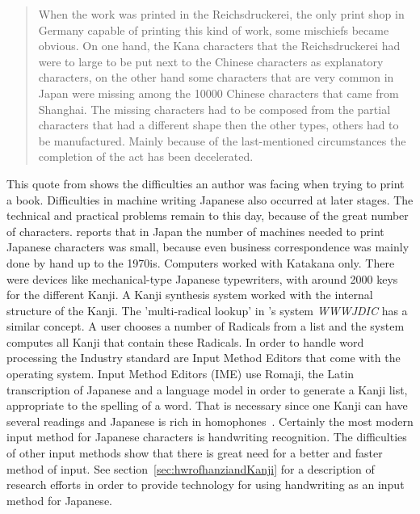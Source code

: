 \begin{quote}
When the work was printed in the Reichsdruckerei, the only print shop
in Germany capable of printing this kind of work, some mischiefs became obvious.
On one hand, the Kana characters that the Reichsdruckerei had were to large to
be put next to the Chinese characters as explanatory characters, on the other
hand some characters that are very common in Japan were missing among 
the 10000 Chinese characters that came from Shanghai.
The missing characters had to be composed from the partial characters that
had a different shape then the other types, others had to be manufactured.
Mainly because of the last-mentioned circumstances the completion of the
act has been decelerated.
\end{quote}
This quote from  shows the difficulties an author
was facing when trying to print a book. 
Difficulties in machine writing Japanese also occurred at later stages. The 
technical and practical problems remain to this day, because of the great number
of characters.  reports that in Japan the number of 
machines needed to print Japanese characters was small, because even business
correspondence was mainly done by hand up to the 1970is. Computers worked with
Katakana only. There were devices like mechanical-type Japanese typewriters,
with around 2000 keys for the different Kanji. A Kanji synthesis system worked
with the internal structure of the Kanji. The 'multi-radical lookup' in 
's \citeyear{Breen2004} system \emph{WWWJDIC} has
a similar concept. A user chooses a number of Radicals from a list and the 
system computes all Kanji that contain these Radicals.
In order to handle word processing the Industry standard are Input Method Editors
that come with the operating system. Input Method Editors (IME) use 
Romaji, the Latin transcription of Japanese and a language model in order to
generate a Kanji list, appropriate to the spelling of a 
word. That is necessary since one Kanji can have several readings and Japanese
is rich in homophones~. 
Certainly the most modern input method for Japanese characters is handwriting
recognition. The difficulties of other input methods show that there is 
great need for a better and faster method of input. See 
section~\ref{sec:hwrofhanziandKanji} for a description of research 
efforts in order to provide technology for using handwriting as an input method 
for Japanese.

